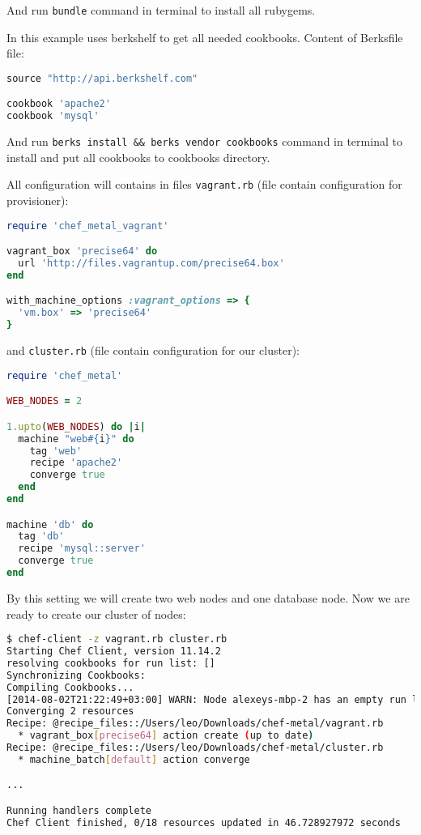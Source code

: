 And run \lstinline!bundle! command in terminal to install all rubygems.

In this example uses berkshelf to get all needed cookbooks. Content of Berksfile file:

\begin{lstlisting}[language=Ruby,label=lst:tat-chef-metal4]
source "http://api.berkshelf.com"

cookbook 'apache2'
cookbook 'mysql'
\end{lstlisting}

And run \lstinline!berks install && berks vendor cookbooks! command in terminal to install and put all cookbooks to cookbooks directory.

All configuration will contains in files \lstinline!vagrant.rb! (file contain configuration for provisioner):

\begin{lstlisting}[language=Ruby,label=lst:tat-chef-metal5]
require 'chef_metal_vagrant'

vagrant_box 'precise64' do
  url 'http://files.vagrantup.com/precise64.box'
end

with_machine_options :vagrant_options => {
  'vm.box' => 'precise64'
}
\end{lstlisting}

and \lstinline!cluster.rb! (file contain configuration for our cluster):

\begin{lstlisting}[language=Ruby,label=lst:tat-chef-metal6]
require 'chef_metal'

WEB_NODES = 2

1.upto(WEB_NODES) do |i|
  machine "web#{i}" do
    tag 'web'
    recipe 'apache2'
    converge true
  end
end

machine 'db' do
  tag 'db'
  recipe 'mysql::server'
  converge true
end
\end{lstlisting}

By this setting we will create two web nodes and one database node. Now we are ready to create our cluster of nodes:

\begin{lstlisting}[language=Bash,label=lst:tat-chef-metal7]
$ chef-client -z vagrant.rb cluster.rb
Starting Chef Client, version 11.14.2
resolving cookbooks for run list: []
Synchronizing Cookbooks:
Compiling Cookbooks...
[2014-08-02T21:22:49+03:00] WARN: Node alexeys-mbp-2 has an empty run list.
Converging 2 resources
Recipe: @recipe_files::/Users/leo/Downloads/chef-metal/vagrant.rb
  * vagrant_box[precise64] action create (up to date)
Recipe: @recipe_files::/Users/leo/Downloads/chef-metal/cluster.rb
  * machine_batch[default] action converge

...

Running handlers complete
Chef Client finished, 0/18 resources updated in 46.728927972 seconds
\end{lstlisting}

